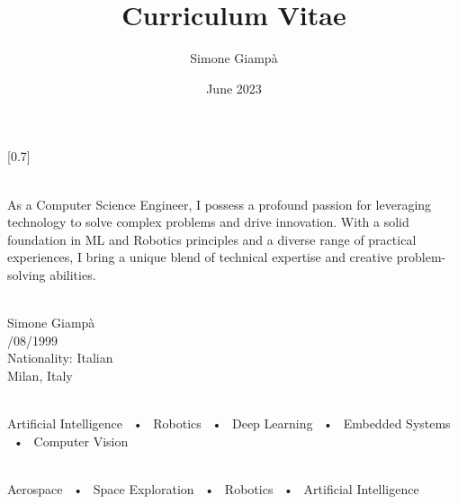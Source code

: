 \documentclass[pastel]{simplehipstercv}
\title{Curriculum Vitae}
\author{Simone Giampà}
\date{June 2023}
\begin{document}
\thispagestyle{empty}

\section*{}



\subsection*{}
\vspace{4em}
\setlength{\columnsep}{3em}
[0.7]
\begin{paracol}{2}

\paracolbackgroundoptions

\footnotesize
{
\flushright
\color{black}
\\[0.5em]
As a Computer Science Engineer, I possess a profound passion for leveraging technology to solve complex problems and drive innovation. With a solid foundation in ML and Robotics principles and a diverse range of practical experiences, I bring a unique blend of technical expertise and creative problem-solving abilities.
\bigskip

 \\[0.3em]
Simone Giampà \\
\vspace{0.2em}
\faBirthdayCake {}/08/1999 \\
\vspace{0.2em}
\faGlobe \; Nationality: Italian \\
\vspace{0.2em}
\faMapMarker \; Milan, Italy \\

\bigskip

 \\[0.5em]

Artificial Intelligence ~•~ Robotics ~•~ Deep Learning ~•~ Embedded Systems  ~•~ Computer Vision

\medskip

\\[0.5em]

Aerospace ~•~ Space Exploration ~•~ Robotics ~•~ Artificial Intelligence 

}
\end{paracol}
\end{document}
